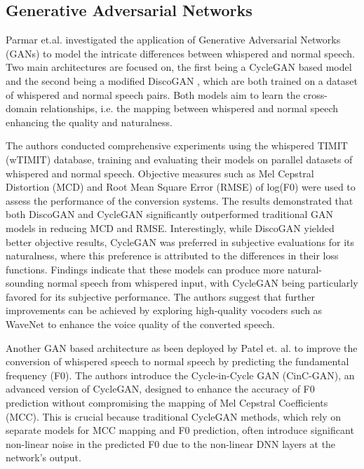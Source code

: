 \subsection{Generative Adversarial Networks}

Parmar et.al. \cite{parmarEffectivenessCrossdomainArchitectures2019} investigated the application of Generative Adversarial Networks (GANs) to model the intricate differences between whispered and normal speech. Two main architectures are focused on, the first being a CycleGAN \cite{zhu2020unpairedimagetoimagetranslationusing} based model and the second being a modified DiscoGAN \cite{shahNovelMMSEDiscoGAN2018}, which are both trained on a dataset of whispered and normal speech pairs. Both models aim to learn the cross-domain relationships, i.e. the mapping between whispered and normal speech enhancing the quality and naturalness.

The authors conducted comprehensive experiments using the whispered TIMIT (wTIMIT) database, training and evaluating their models on parallel datasets of whispered and normal speech. Objective measures such as Mel Cepstral Distortion (MCD) and Root Mean Square Error (RMSE) of log(F0) were used to assess the performance of the conversion systems. The results demonstrated that both DiscoGAN and CycleGAN significantly outperformed traditional GAN models in reducing MCD and RMSE. Interestingly, while DiscoGAN yielded better objective results, CycleGAN was preferred in subjective evaluations for its naturalness, where this preference is attributed to the differences in their loss functions. Findings indicate that these models can produce more natural-sounding normal speech from whispered input, with CycleGAN being particularly favored for its subjective performance. The authors suggest that further improvements can be achieved by exploring high-quality vocoders such as WaveNet \cite{oord2017parallelwavenetfasthighfidelity} to enhance the voice quality of the converted speech.

Another GAN based architecture as been deployed by Patel et. al. \cite{patelCinCGANEffectiveF02021} to improve the conversion of whispered speech to normal speech by predicting the fundamental frequency (F0). The authors introduce the Cycle-in-Cycle GAN (CinC-GAN), an advanced version of CycleGAN, designed to enhance the accuracy of F0 prediction without compromising the mapping of Mel Cepstral Coefficients (MCC). This is crucial because traditional CycleGAN methods, which rely on separate models for MCC mapping and F0 prediction, often introduce significant non-linear noise in the predicted F0 due to the non-linear DNN layers at the network's output.


